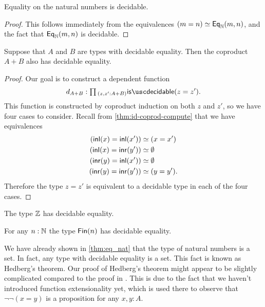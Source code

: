 \begin{cor}
  Equality on the natural numbers is decidable.
\end{cor}

\begin{proof}
  This follows immediately from the equivalences $(m=n)\simeq \mathsf{Eq}_{{\mathbb{N}}}(m,n)$, and the fact that $\mathsf{Eq}_{{\mathbb{N}}}(m,n)$ is decidable.
\end{proof}

\begin{lem}
  Suppose that $A$ and $B$ are types with decidable equality. Then the coproduct $A+B$ also has decidable equality.
\end{lem}

\begin{proof}
  Our goal is to construct a dependent function
  \begin{equation*}
    d_{A+B} : \prd{z,z':A+B}\isdecidable(z=z').
  \end{equation*}
  This function is constructed by coproduct induction on both $z$ and $z'$, so we have four cases to consider. Recall from \cref{thm:id-coprod-compute} that we have equivalences
  \begin{align*}
    ({\mathsf{inl}}(x)={\mathsf{inl}}(x')) & \simeq (x=x') \\
    ({\mathsf{inl}}(x)={\mathsf{inr}}(y')) & \simeq \emptyset \\
    ({\mathsf{inr}}(y)={\mathsf{inl}}(x')) & \simeq \emptyset \\
    ({\mathsf{inr}}(y)={\mathsf{inr}}(y')) & \simeq (y=y').
  \end{align*}
  Therefore the type $z=z'$ is equivalent to a decidable type in each of the four cases.
\end{proof}

\begin{cor}
  The type ${\mathbb{Z}}$ has decidable equality.
\end{cor}

\begin{cor}
  For any $n:{\mathbb{N}}$ the type $\mathsf{Fin}(n)$ has decidable equality. 
\end{cor}

We have already shown in \cref{thm:eq_nat} that the type of natural numbers is a set. In fact, any type with decidable equality is a set. This fact is known as Hedberg's theorem. Our proof of Hedberg's theorem might appear to be slightly complicated compared to the proof in \cite{hottbook}. This is due to the fact that we haven't introduced function extensionality yet, which is used there to observe that $\neg\neg(x=y)$ is a proposition for any $x,y:A$.

